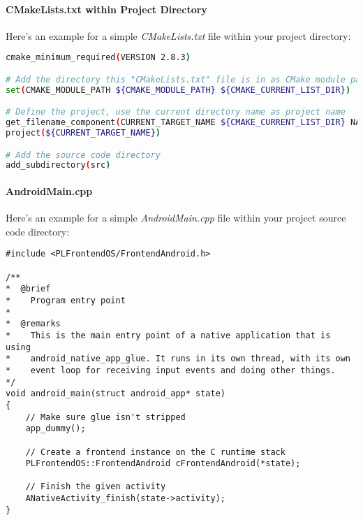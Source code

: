 \paragraph{CMakeLists.txt within Project Directory}
Here's an example for a simple \emph{CMakeLists.txt} file within your project directory:
\begin{lstlisting}[language=sh]
cmake_minimum_required(VERSION 2.8.3)

# Add the directory this "CMakeLists.txt" file is in as CMake module path in order to make it possible to find "FindPixelLight.cmake"
set(CMAKE_MODULE_PATH ${CMAKE_MODULE_PATH} ${CMAKE_CURRENT_LIST_DIR})

# Define the project, use the current directory name as project name
get_filename_component(CURRENT_TARGET_NAME ${CMAKE_CURRENT_LIST_DIR} NAME_WE)
project(${CURRENT_TARGET_NAME})

# Add the source code directory
add_subdirectory(src)
\end{lstlisting}


\paragraph{AndroidMain.cpp}
Here's an example for a simple \emph{AndroidMain.cpp} file within your project source code directory:
\begin{lstlisting}[]
#include <PLFrontendOS/FrontendAndroid.h>

/**
*  @brief
*    Program entry point
*
*  @remarks
*    This is the main entry point of a native application that is using
*    android_native_app_glue. It runs in its own thread, with its own
*    event loop for receiving input events and doing other things.
*/
void android_main(struct android_app* state)
{
	// Make sure glue isn't stripped
	app_dummy();

	// Create a frontend instance on the C runtime stack
	PLFrontendOS::FrontendAndroid cFrontendAndroid(*state);

	// Finish the given activity
	ANativeActivity_finish(state->activity);
}
\end{lstlisting}



